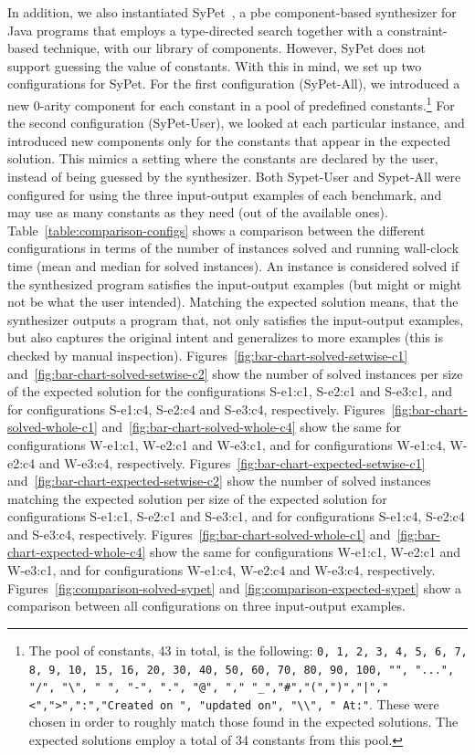 In addition, we also instantiated SyPet~\cite{Feng:2017:CSC}, a
\gls{pbe} component-based synthesizer for Java programs that employs a
type-directed search together with a constraint-based technique, with our
library of components.
However, SyPet does not support guessing the value of constants.
With this in mind, we set up two configurations for SyPet.
For the first configuration (SyPet-All), we introduced a new 0-arity component
for each constant in a pool of predefined constants.\footnote{The pool of
constants, 43 in total, is the following: \lstinline{0, 1, 2, 3, 4, 5, 6, 7, 8,
9, 10, 15, 16, 20, 30, 40, 50, 60, 70, 80, 90, 100, "", "...", "/", "\", " ",
"-", ".", "@", "," "_","#","(",")","|","<",">",":","Created on ", "updated on",
"\\", " At:"}. These were chosen in order to roughly match those found in the
expected solutions. The expected solutions employ a total of 34 constants from
this pool.}
For the second configuration (SyPet-User), we looked at each particular
instance, and introduced new components only for the constants that appear in
the expected solution.
This mimics a setting where the constants are declared by the user, instead of
being guessed by the synthesizer.
Both Sypet\nobreakdash-User and Sypet-All were configured for using the three
input-output examples of each benchmark, and may use as many constants as they
need (out of the available ones).
Table~\ref{table:comparison-configs} shows a comparison between the different
configurations in terms of the number of instances solved and running wall-clock
time (mean and median for solved instances).
An instance is considered solved if the synthesized program satisfies the
input-output examples (but might or might not be what the user intended).
Matching the expected solution means, that the synthesizer outputs a program
that, not only satisfies the input-output examples, but also captures the
original intent and generalizes to more examples (this is checked by manual
inspection).
Figures~\ref{fig:bar-chart-solved-setwise-c1}
and~\ref{fig:bar-chart-solved-setwise-c2} show the number of solved instances
per size of the expected solution for the configurations S-e1:c1, S-e2:c1 and
S-e3:c1, and for configurations S-e1:c4, S-e2:c4 and S-e3:c4, respectively.
Figures~\ref{fig:bar-chart-solved-whole-c1}
and~\ref{fig:bar-chart-solved-whole-c4} show the same for configurations
W-e1:c1, W-e2:c1 and W-e3:c1, and for configurations W-e1:c4, W-e2:c4 and
W-e3:c4, respectively.
Figures~\ref{fig:bar-chart-expected-setwise-c1}
and~\ref{fig:bar-chart-expected-setwise-c2} show the number of solved instances
matching the expected solution per size of the expected solution for
configurations S-e1:c1, S-e2:c1 and S-e3:c1, and for configurations
S-e1:c4, S-e2:c4 and S-e3:c4, respectively.
Figures~\ref{fig:bar-chart-solved-whole-c1}
and~\ref{fig:bar-chart-expected-whole-c4} show the same for configurations
W-e1:c1, W-e2:c1 and W-e3:c1, and for configurations W-e1:c4, W-e2:c4 and
W-e3:c4, respectively.
Figures~\ref{fig:comparison-solved-sypet} and
\ref{fig:comparison-expected-sypet} show a comparison between all configurations
on three input-output examples.

